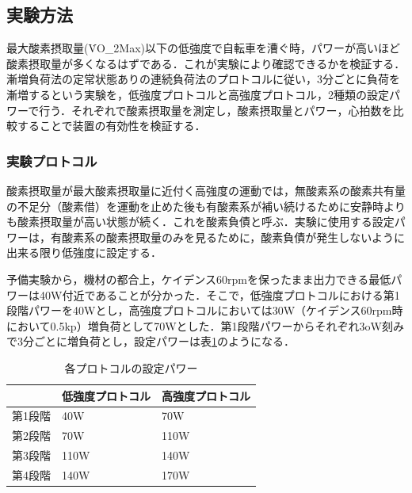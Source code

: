 


\subsection{実験方法}

最大酸素摂取量(\.{V}O_2Max)以下の低強度で自転車を漕ぐ時，パワーが高いほど酸素摂取量が多くなるはずである．これが実験により確認できるかを検証する．漸増負荷法の定常状態ありの連続負荷法のプロトコルに従い\cite{science_of_vo2}，3分ごとに負荷を漸増するという実験を，低強度プロトコルと高強度プロトコル，2種類の設定パワーで行う．それぞれで酸素摂取量を測定し，酸素摂取量とパワー，心拍数を比較することで装置の有効性を検証する．

\subsubsection{実験プロトコル}

酸素摂取量が最大酸素摂取量に近付く高強度の運動では，無酸素系の酸素共有量の不足分（酸素借）を運動を止めた後も有酸素系が補い続けるために安静時よりも酸素摂取量が高い状態が続く．これを酸素負債と呼ぶ．実験に使用する設定パワーは，有酸素系の酸素摂取量のみを見るために，酸素負債が発生しないように出来る限り低強度に設定する．

予備実験から，機材の都合上，ケイデンス60rpmを保ったまま出力できる最低パワーは40W付近であることが分かった．そこで，低強度プロトコルにおける第1段階パワーを40Wとし，高強度プロトコルにおいては30W（ケイデンス60rpm時において0.5kp）増負荷として70Wとした．第1段階パワーからそれぞれ3oW刻みで3分ごとに増負荷とし，設定パワーは表\ref{tb:protocol_power}のようになる．

\begin{table}[H]
\begin{center}
  \caption{各プロトコルの設定パワー}
  \label{tb:protocol_power}
  \begin{tabular}{|l|l|l|}
  \hline
       & 低強度プロトコル & 高強度プロトコル \\ \hline
  第1段階 & 40W      & 70W      \\ \hline
  第2段階 & 70W      & 110W     \\ \hline
  第3段階 & 110W     & 140W     \\ \hline
  第4段階 & 140W     & 170W     \\ \hline
  \end{tabular}
\end{center}
\end{table}

